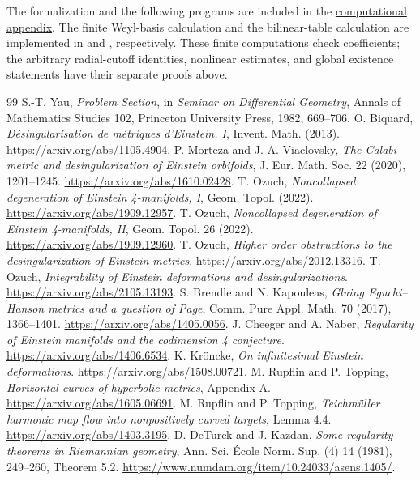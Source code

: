 \documentclass[a4paper,11pt]{article}
\numberwithin{equation}{section}
\theoremstyle{definition}
\begin{document}
The formalization and the following programs are included in
the \href{../references/computations.md}{computational appendix}.
The finite Weyl-basis calculation and the bilinear-table calculation are implemented in
 and
, respectively.
These finite computations check coefficients; the arbitrary radial-cutoff identities, nonlinear estimates, and global existence statements have their separate proofs above.
\clearpage
\begin{thebibliography}{99}
 S.-T. Yau, \emph{Problem Section}, in \emph{Seminar on Differential Geometry}, Annals of Mathematics Studies 102, Princeton University Press, 1982, 669--706.
 O. Biquard, \emph{D\'esingularisation de m\'etriques d'Einstein. I}, Invent. Math. (2013). \url{https://arxiv.org/abs/1105.4904}.
 P. Morteza and J. A. Viaclovsky, \emph{The Calabi metric and desingularization of Einstein orbifolds}, J. Eur. Math. Soc. 22 (2020), 1201--1245. \url{https://arxiv.org/abs/1610.02428}.
 T. Ozuch, \emph{Noncollapsed degeneration of Einstein 4-manifolds, I}, Geom. Topol. (2022). \url{https://arxiv.org/abs/1909.12957}.
 T. Ozuch, \emph{Noncollapsed degeneration of Einstein 4-manifolds, II}, Geom. Topol. 26 (2022). \url{https://arxiv.org/abs/1909.12960}.
 T. Ozuch, \emph{Higher order obstructions to the desingularization of Einstein metrics}. \url{https://arxiv.org/abs/2012.13316}.
 T. Ozuch, \emph{Integrability of Einstein deformations and desingularizations}. \url{https://arxiv.org/abs/2105.13193}.
 S. Brendle and N. Kapouleas, \emph{Gluing Eguchi--Hanson metrics and a question of Page}, Comm. Pure Appl. Math. 70 (2017), 1366--1401. \url{https://arxiv.org/abs/1405.0056}.
 J. Cheeger and A. Naber, \emph{Regularity of Einstein manifolds and the codimension 4 conjecture}. \url{https://arxiv.org/abs/1406.6534}.
 K. Kr\"oncke, \emph{On infinitesimal Einstein deformations}. \url{https://arxiv.org/abs/1508.00721}.
 M. Rupflin and P. Topping, \emph{Horizontal curves of hyperbolic metrics}, Appendix A. \url{https://arxiv.org/abs/1605.06691}.
 M. Rupflin and P. Topping, \emph{Teichm\"uller harmonic map flow into nonpositively curved targets}, Lemma 4.4. \url{https://arxiv.org/abs/1403.3195}.
 D. DeTurck and J. Kazdan, \emph{Some regularity theorems in Riemannian geometry}, Ann. Sci. \'Ecole Norm. Sup. (4) 14 (1981), 249--260, Theorem 5.2. \url{https://www.numdam.org/item/10.24033/asens.1405/}.

\end{thebibliography}
\end{document}
